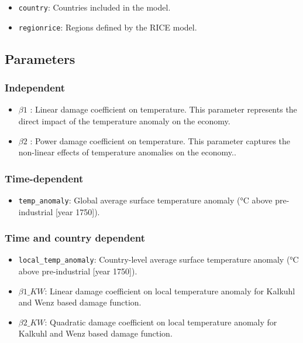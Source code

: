 \documentclass[
]{article}
\providecommand{\tightlist}{%
  \setlength{\itemsep}{0pt}\setlength{\parskip}{0pt}}
\begin{document}
\begin{itemize}
\tightlist
\item
  \texttt{country}: Countries included in the model.
\item
  \texttt{regionrice}: Regions defined by the RICE model.
\end{itemize}

\subsection{Parameters}\label{parameters-1}

\subsubsection{Independent}\label{independent-1}

\begin{itemize}
\tightlist
\item
  \(\beta1\) : Linear damage coefficient on temperature. This parameter
  represents the direct impact of the temperature anomaly on the
  economy.
\item
  \(\beta2\) : Power damage coefficient on temperature. This parameter
  captures the non-linear effects of temperature anomalies on the
  economy..
\end{itemize}

\subsubsection{Time-dependent}\label{time-dependent-2}

\begin{itemize}
\tightlist
\item
  \texttt{temp\_anomaly}: Global average surface temperature anomaly (°C
  above pre-industrial {[}year 1750{]}).
\end{itemize}

\subsubsection{Time and country
dependent}\label{time-and-country-dependent-2}

\begin{itemize}
\tightlist
\item
  \texttt{local\_temp\_anomaly}: Country-level average surface
  temperature anomaly (°C above pre-industrial {[}year 1750{]}).
\item
  \(\beta1\_{KW}\): Linear damage coefficient on local temperature
  anomaly for Kalkuhl and Wenz based damage function.
\item
  \(\beta2\_{KW}\): Quadratic damage coefficient on local temperature
  anomaly for Kalkuhl and Wenz based damage function.
\end{itemize}
\end{document}
